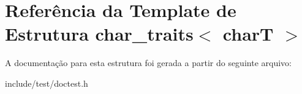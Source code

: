 \hypertarget{structchar__traits}{}\section{Referência da Template de Estrutura char\+\_\+traits$<$ charT $>$}
\label{structchar__traits}


A documentação para esta estrutura foi gerada a partir do seguinte arquivo\+:\begin{DoxyCompactItemize}
\item 
include/test/doctest.\+h\end{DoxyCompactItemize}
